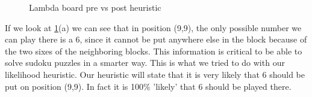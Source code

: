\documentclass{report}
\begin{document}
\begin{figure}[h]
    \centering
    \qquad
    \caption{Lambda board pre vs post heuristic}%
    \label{fig:classic_heuristic}%
\end{figure}
If we look at \ref{fig:classic_heuristic}(a) we can see that in position (9,9), the only possible number we can play there is a 6, since it cannot be put anywhere else in the block because of the two sixes of the neighboring blocks. This information is critical to be able to solve sudoku puzzles in a smarter way. This is what we tried to do with our likelihood heuristic. Our heuristic will state that it is very likely that 6 should be put on position (9,9). In fact it is 100\% 'likely' that 6 should be played there.
\newline
\newline
\newline
\end{document}
